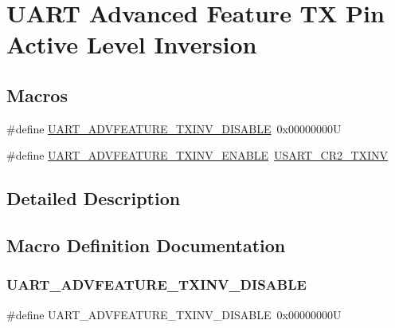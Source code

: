 \hypertarget{group___u_a_r_t___tx___inv}{}\section{U\+A\+RT Advanced Feature TX Pin Active Level Inversion}
\label{group___u_a_r_t___tx___inv}
\subsection*{Macros}
\begin{DoxyCompactItemize}
\item 
\#define \mbox{\hyperlink{group___u_a_r_t___tx___inv_gaf2ef53664b0d4b93758575b9ee1b949b}{U\+A\+R\+T\+\_\+\+A\+D\+V\+F\+E\+A\+T\+U\+R\+E\+\_\+\+T\+X\+I\+N\+V\+\_\+\+D\+I\+S\+A\+B\+LE}}~0x00000000U
\item 
\#define \mbox{\hyperlink{group___u_a_r_t___tx___inv_ga1e0ddbed5fc5ddce5314f63e96e29c3d}{U\+A\+R\+T\+\_\+\+A\+D\+V\+F\+E\+A\+T\+U\+R\+E\+\_\+\+T\+X\+I\+N\+V\+\_\+\+E\+N\+A\+B\+LE}}~\mbox{\hyperlink{group___peripheral___registers___bits___definition_gadc2ad93cdc6d8f138f455a2fb671a211}{U\+S\+A\+R\+T\+\_\+\+C\+R2\+\_\+\+T\+X\+I\+NV}}
\end{DoxyCompactItemize}


\subsection{Detailed Description}


\subsection{Macro Definition Documentation}
\mbox{\label{group___u_a_r_t___tx___inv_gaf2ef53664b0d4b93758575b9ee1b949b}} 
\subsubsection{\texorpdfstring{UART\_ADVFEATURE\_TXINV\_DISABLE}{UART\_ADVFEATURE\_TXINV\_DISABLE}}
{\footnotesize\ttfamily \#define U\+A\+R\+T\+\_\+\+A\+D\+V\+F\+E\+A\+T\+U\+R\+E\+\_\+\+T\+X\+I\+N\+V\+\_\+\+D\+I\+S\+A\+B\+LE~0x00000000U}

